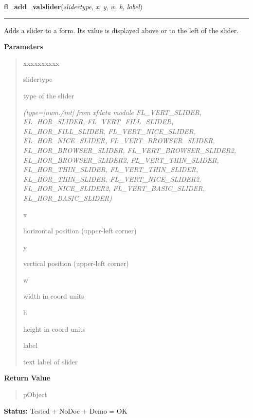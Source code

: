 \hspace{.8\funcindent}\begin{boxedminipage}{\funcwidth}

    \raggedright \textbf{fl\_add\_valslider}(\textit{slidertype}, \textit{x}, \textit{y}, \textit{w}, \textit{h}, \textit{label})

    \vspace{-1.5ex}

    \rule{\textwidth}{0.5\fboxrule}
\setlength{\parskip}{2ex}
    Adds a slider to a form. Its value is displayed above or to the left of
    the slider.

\setlength{\parskip}{1ex}
      \textbf{Parameters}
      \vspace{-1ex}

      \begin{quote}
        \begin{Ventry}{xxxxxxxxxx}

          \item[slidertype]

          type of the slider

            {\it (type=[num./int] from xfdata module FL\_VERT\_SLIDER, FL\_HOR\_SLIDER, 
FL\_VERT\_FILL\_SLIDER, FL\_HOR\_FILL\_SLIDER, FL\_VERT\_NICE\_SLIDER, 
FL\_HOR\_NICE\_SLIDER, FL\_VERT\_BROWSER\_SLIDER, FL\_HOR\_BROWSER\_SLIDER,
FL\_VERT\_BROWSER\_SLIDER2, FL\_HOR\_BROWSER\_SLIDER2, 
FL\_VERT\_THIN\_SLIDER, FL\_HOR\_THIN\_SLIDER, FL\_VERT\_THIN\_SLIDER, 
FL\_HOR\_THIN\_SLIDER, FL\_VERT\_NICE\_SLIDER2, FL\_HOR\_NICE\_SLIDER2, 
FL\_VERT\_BASIC\_SLIDER, FL\_HOR\_BASIC\_SLIDER)}

          \item[x]

          horizontal position (upper-left corner)

          \item[y]

          vertical position (upper-left corner)

          \item[w]

          width in coord units

          \item[h]

          height in coord units

          \item[label]

          text label of slider

        \end{Ventry}

      \end{quote}

      \textbf{Return Value}
    \vspace{-1ex}

      \begin{quote}
      pObject

      \end{quote}

\textbf{Status:} Tested + NoDoc + Demo = OK



    \end{boxedminipage}

